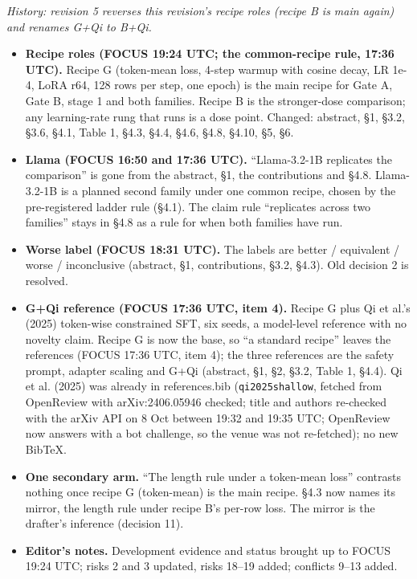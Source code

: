 \documentclass{article}
\theoremstyle{plain}
\theoremstyle{definition}
\theoremstyle{remark}
\begin{document}
\emph{History: revision 5 reverses this revision's recipe roles (recipe B is
main again) and renames G+Qi to B+Qi.}

\begin{itemize}
  \item \textbf{Recipe roles (FOCUS 19:24 UTC; the common-recipe rule, 17:36
        UTC).} Recipe G (token-mean loss, 4-step warmup with cosine decay, LR
        1e-4, LoRA r64, 128 rows per step, one epoch) is the main recipe for
        Gate A, Gate B, stage 1 and both families. Recipe B is the stronger-dose
        comparison; any learning-rate rung that runs is a dose point. Changed:
        abstract, \S{}1, \S{}3.2, \S{}3.6, \S{}4.1, Table 1, \S{}4.3, \S{}4.4,
        \S{}4.6, \S{}4.8, \S{}4.10, \S{}5, \S{}6.
  \item \textbf{Llama (FOCUS 16:50 and 17:36 UTC).} ``Llama-3.2-1B replicates
        the comparison'' is gone from the abstract, \S{}1, the contributions and
        \S{}4.8. Llama-3.2-1B is a planned second family under one common
        recipe, chosen by the pre-registered ladder rule (\S{}4.1). The claim
        rule ``replicates across two families'' stays in \S{}4.8 as a rule for
        when both families have run.
  \item \textbf{Worse label (FOCUS 18:31 UTC).} The labels are better /
        equivalent / worse / inconclusive (abstract, \S{}1, contributions,
        \S{}3.2, \S{}4.3). Old decision 2 is resolved.
  \item \textbf{G+Qi reference (FOCUS 17:36 UTC, item 4).} Recipe G plus Qi et
        al.'s (2025) token-wise constrained SFT, six seeds, a model-level
        reference with no novelty claim. Recipe G is now the base, so ``a
        standard recipe'' leaves the references (FOCUS 17:36 UTC, item 4); the
        three references are the safety prompt, adapter scaling and G+Qi
        (abstract, \S{}1, \S{}2, \S{}3.2, Table 1, \S{}4.4). Qi et al. (2025)
        was already in references.bib (\texttt{qi2025shallow}, fetched from
        OpenReview with arXiv:2406.05946 checked; title and authors re-checked
        with the arXiv API on 8 Oct between 19:32 and 19:35 UTC; OpenReview now
        answers with a bot challenge, so the venue was not re-fetched); no new
        BibTeX.
  \item \textbf{One secondary arm.} ``The length rule under a token-mean loss''
        contrasts nothing once recipe G (token-mean) is the main recipe. \S{}4.3
        now names its mirror, the length rule under recipe B's per-row loss. The
        mirror is the drafter's inference (decision 11).
  \item \textbf{Editor's notes.} Development evidence and status brought up to
        FOCUS 19:24 UTC; risks 2 and 3 updated, risks 18--19 added; conflicts
        9--13 added.
\end{itemize}
\end{document}
